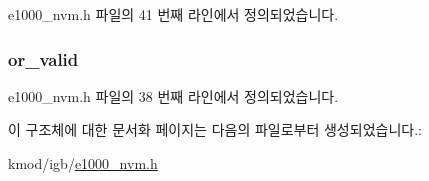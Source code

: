 e1000\+\_\+nvm.\+h 파일의 41 번째 라인에서 정의되었습니다.

\subsubsection[{\texorpdfstring{or\+\_\+valid}{or_valid}}]{ or\+\_\+valid}\hypertarget{structe1000__fw__version_aac61628b4847b8546bbe2475b17b382f}{}\label{structe1000__fw__version_aac61628b4847b8546bbe2475b17b382f}


e1000\+\_\+nvm.\+h 파일의 38 번째 라인에서 정의되었습니다.



이 구조체에 대한 문서화 페이지는 다음의 파일로부터 생성되었습니다.\+:\begin{DoxyCompactItemize}
\item 
kmod/igb/\hyperlink{e1000__nvm_8h}{e1000\+\_\+nvm.\+h}\end{DoxyCompactItemize}
